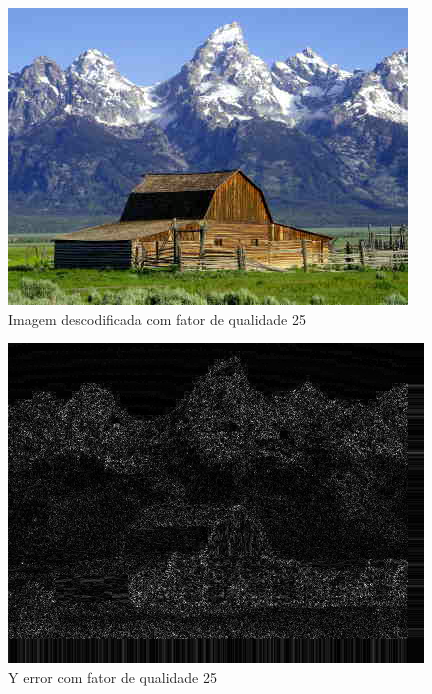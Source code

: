 \documentclass[a4paper, 12pt]{article}
\begin{document}
        \begin{multicols}{2}
            \begin{figure}[H]
                \includegraphics[width=\linewidth]{resources/DIFFS/Descodification_quality_25.png}
                \caption{\label{fig:my_label} Imagem descodificada com fator de qualidade 25}
            \end{figure}
            \begin{figure}[H]
                \includegraphics[width=\linewidth]{resources/DIFFS/Diff_Image_with_quality_25.png}
                \caption{\label{fig:my_label} Y error com fator de qualidade 25}
            \end{figure}
        \end{multicols}
\end{document}

